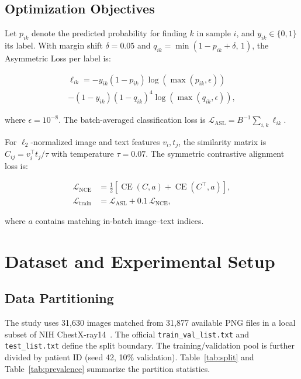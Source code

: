 \documentclass[runningheads,a4paper]{llncs}
\begin{document}
\subsection{Optimization Objectives}

Let $p_{ik}$ denote the predicted probability for finding $k$ in sample $i$, and $y_{ik}\!\in\!\{0,1\}$ its label.
With margin shift $\delta\!=\!0.05$ and $q_{ik}\!=\!\min(1-p_{ik}+\delta,\,1)$, the Asymmetric Loss per label is:

\begin{multline}
\ell_{ik}=
-y_{ik}(1-p_{ik})
\log(\max(p_{ik},\epsilon))\\
-(1-y_{ik})(1-q_{ik})^4
\log(\max(q_{ik},\epsilon)),
\end{multline}

\noindent where $\epsilon\!=\!10^{-8}$.
The batch-averaged classification loss is $\mathcal{L}_{\mathrm{ASL}}\!=\!B^{-1}\!\sum_{i,k}\ell_{ik}$.

For $\ell_2$-normalized image and text features $v_i,t_j$, the similarity matrix is $C_{ij}\!=\!v_i^\top t_j/\tau$ with temperature $\tau\!=\!0.07$.
The symmetric contrastive alignment loss is:

\begin{align}
\mathcal{L}_{\mathrm{NCE}}
&=\tfrac{1}{2}
[\operatorname{CE}(C,a)+
\operatorname{CE}(C^\top\!,a)],\\
\mathcal{L}_{\mathrm{train}}
&=\mathcal{L}_{\mathrm{ASL}}
+0.1\,\mathcal{L}_{\mathrm{NCE}},
\end{align}

\noindent where $a$ contains matching in-batch image--text indices.

\section{Dataset and Experimental Setup}

\subsection{Data Partitioning}

The study uses 31{,}630 images matched from 31{,}877 available PNG files in a local subset of NIH ChestX-ray14~\cite{nihdataset}.
The official \texttt{train\_val\_list.txt} and \texttt{test\_list.txt} define the split boundary.
The training/validation pool is further divided by patient ID (seed 42, 10\% validation).
Table~\ref{tab:split} and Table~\ref{tab:prevalence} summarize the partition statistics.
\end{document}
